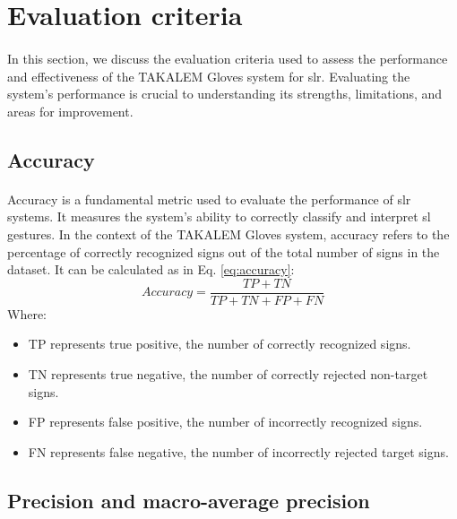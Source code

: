 \section{Evaluation criteria}
\paragraph{}
In this section, we discuss the evaluation criteria used to assess the performance and effectiveness of the TAKALEM Gloves system for \ac{slr}. Evaluating the system's performance is crucial to understanding its strengths, limitations, and areas for improvement.
\subsection{Accuracy}
\paragraph{}
Accuracy is a fundamental metric used to evaluate the performance of \ac{slr} systems. It measures the system's ability to correctly classify and interpret \ac{sl} gestures. In the context of the TAKALEM Gloves system, accuracy refers to the percentage of correctly recognized signs out of the total number of signs in the dataset. It can be calculated as in Eq. \ref{eq:accuracy}:
\begin{equation}
	Accuracy = \frac{TP + TN}{TP + TN + FP + FN} \label{eq:accuracy}
\end{equation}
Where:
\begin{itemize}
	\item TP represents true positive, the number of correctly recognized signs.
	\item TN represents true negative, the number of correctly rejected non-target signs.
	\item FP represents false positive, the number of incorrectly recognized signs.
	\item FN represents false negative, the number of incorrectly rejected target signs.
\end{itemize}
\subsection{Precision and macro-average precision}
